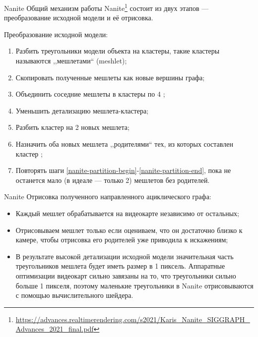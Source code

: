 \documentclass{beamer}
\begin{document}
    \begin{frame}{Nanite}
        Общий механизм работы
        Nanite\footnote{\url{https://advances.realtimerendering.com/s2021/Karis_Nanite_SIGGRAPH_Advances_2021_final.pdf}}
        состоит из двух этапов ---
        преобразование исходной модели
        и её отрисовка.

        Преобразование исходной модели:
        \begin{enumerate}
            \item Разбить треугольники модели объекта на кластеры, такие кластеры называются ,,мешлетами`` (meshlet);
            \item Скопировать полученные мешлеты как новые вершины графа;
            \item Объединить соседние мешлеты в кластеры по 4 \label{nanite-partition-begin};
            \item Уменьшить детализацию мешлета-кластера;
            \item Разбить кластер на 2 новых мешлета;
            \item Назначить оба новых мешлета ,,родителями`` тех, из которых составлен кластер \label{nanite-partition-end};
            \item Повторять шаги \ref{nanite-partition-begin}-\ref{nanite-partition-end},
            пока не останется мало (в идеале --- только 2) мешлетов без родителей.
        \end{enumerate}
    \end{frame}

    \begin{frame}{Nanite}
        Отрисовка полученного направленного ациклического графа:
        \begin{itemize}
            \item Каждый мешлет обрабатывается на видеокарте
            независимо от остальных;
            \item Отрисовываем мешлет только если оцениваем,
            что он достаточно близко к камере, чтобы
            отрисовка его родителей уже приводила к искажениям;
            \item В результате высокой детализации исходной модели
            значительная часть треугольников мешлета будет
            иметь размер в 1 пиксель.
            Аппаратные оптимизации видеокарт сильно завязаны
            на то, что треугольники сильно больше 1 пикселя,
            поэтому маленькие треугольники в Nanite
            отрисовываются с помощью вычислительного шейдера.
        \end{itemize}
    \end{frame}
\end{document}
